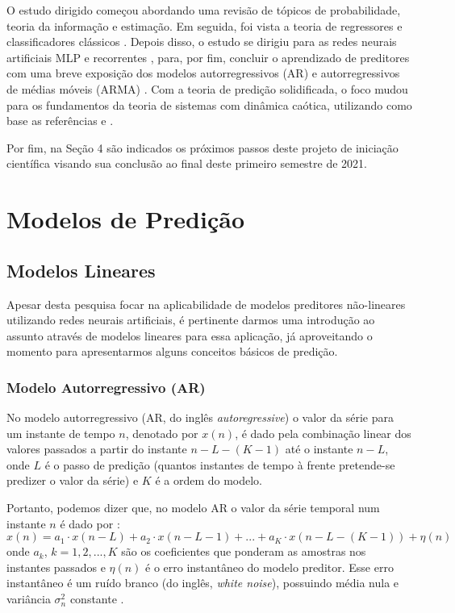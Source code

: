 \documentclass[a4paper, 12pt]{article}
\begin{document}
O estudo dirigido começou abordando uma revisão de tópicos de probabilidade, teoria da informação e estimação. Em seguida, foi vista a teoria de regressores e classificadores clássicos \cite{hastie2009elements}. Depois disso, o estudo se dirigiu para as redes neurais artificiais MLP e recorrentes \cite{geron2019hands}, para, por fim, concluir o aprendizado de preditores com uma breve exposição dos modelos autorregressivos (AR) e autorregressivos de médias móveis (ARMA) \cite{box2015time}. Com a teoria de predição solidificada, o foco mudou para os fundamentos da teoria de sistemas com dinâmica caótica, utilizando como base as referências \cite{fiedler1994caos} e \cite{attux2001dinamica}.

Por fim, na Seção 4 são indicados os próximos passos deste projeto de iniciação científica visando sua conclusão ao final deste primeiro semestre de 2021. 

\section{Modelos de Predição}

\subsection{Modelos Lineares}

Apesar desta pesquisa focar na aplicabilidade de modelos preditores não-lineares utilizando redes neurais artificiais, é pertinente darmos uma introdução ao assunto através de modelos lineares para essa aplicação, já aproveitando o momento para apresentarmos alguns conceitos básicos de predição.

\subsubsection{Modelo Autorregressivo (AR)}

No modelo autorregressivo (AR, do inglês \textit{autoregressive}) o valor da série para um instante de tempo $n$, denotado por $x(n)$, é dado pela combinação linear dos valores passados a partir do instante $n - L - (K - 1)$ até o instante $n - L$, onde $L$ é o passo de predição (quantos instantes de tempo à frente pretende-se predizer o valor da série) e $K$ é a ordem do modelo. 

Portanto, podemos dizer que, no modelo AR o valor da série temporal num instante $n$ é dado por \cite{haykin2008adaptive}:
\begin{equation}
x(n) = a_{1} \cdot x(n - L) + a_{2} \cdot x(n - L - 1) + ... + a_{K} \cdot x(n - L - (K - 1)) + \eta (n)
\end{equation}
onde $a_{k}$, $k = 1, 2, ..., K$ são os coeficientes que ponderam as amostras nos instantes passados e $\eta (n)$ é o erro instantâneo do modelo preditor. Esse erro instantâneo é um ruído branco (do inglês, \textit{white noise}), possuindo média nula e variância $\sigma_{n}^2$ constante \cite{box2015time}.
\end{document}
